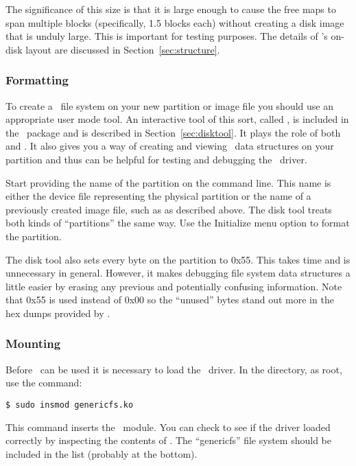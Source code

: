 The significance of this size is that it is large enough to cause the free maps to span multiple
blocks (specifically, 1.5 blocks each) without creating a disk image that is unduly large. This
is important for testing purposes. The details of \GenericFS's on-disk layout are discussed in
Section~\ref{sec:structure}.

\subsubsection{Formatting}

To create a \GenericFS\ file system on your new partition or image file you should use an
appropriate user mode tool. An interactive tool of this sort, called , is
included in the \GenericFS\ package and is described in Section~\ref{sec:disktool}. It plays the
role of both  and . It also gives you a way of creating and viewing
\GenericFS\ data structures on your partition and thus can be helpful for testing and debugging
the \GenericFS\ driver.

Start  providing the name of the partition on the command line. This name is
either the device file representing the physical partition or the name of a previously created
image file, such as  as described above. The disk tool treats both kinds of
``partitions'' the same way. Use the Initialize menu option to format the partition.

The disk tool also sets every byte on the partition to 0x55. This takes time and is unnecessary
in general. However, it makes debugging file system data structures a little easier by erasing
any previous and potentially confusing information. Note that 0x55 is used instead of 0x00 so
the ``unused'' bytes stand out more in the hex dumps provided by .

\subsubsection{Mounting}

Before \GenericFS\ can be used it is necessary to load the \GenericFS\ driver. In the
 directory, as root, use the command:
\begin{verbatim}
$ sudo insmod genericfs.ko
\end{verbatim}

This command inserts the \GenericFS\ module. You can check to see if the driver loaded correctly
by inspecting the contents of . The ``genericfs'' file system should
be included in the list (probably at the bottom).

